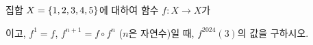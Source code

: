 집합 $X=\{1{,}\mkern3mu\mathopen{}2{,}\mkern3mu\mathopen{}3{,}\mkern3mu\mathopen{}4{,}\mkern3mu\mathopen{}5\}$에 대하여 함수 $f:X\longrightarrow X$가 \par\smallskip{}\par\smallskip\noindent 이고, $f^1=f$, $f^{n+1}=f\circ f^n$ ($n$은 자연수)일 때, $f^{2024}(3)$의 값을 구하시오.
